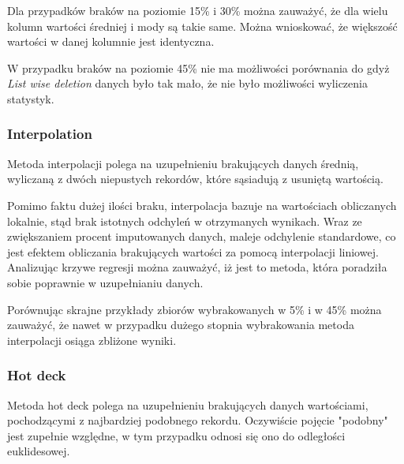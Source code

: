 \documentclass{classrep}
\begin{document}
{{            Dla przypadków braków na poziomie 15\% i 30\% można zauważyć, że dla wielu 
            kolumn wartości średniej i mody są takie same. Można wnioskować, że
            większość wartości w danej kolumnie jest identyczna.
            
            W przypadku braków na poziomie 45\% nie ma możliwości porównania do 
            gdyż \textit{List wise deletion} danych było tak mało, że nie było możliwości 
            wyliczenia statystyk.
        }

        \subsubsection{Interpolation}
        \label{summary:interpolation} {
            Metoda interpolacji polega na uzupełnieniu brakujących danych średnią,
            wyliczaną z dwóch niepustych rekordów, które sąsiadują z usuniętą wartością.

            Pomimo faktu dużej ilości braku, interpolacja bazuje na wartościach
            obliczanych lokalnie, stąd brak istotnych odchyleń w otrzymanych wynikach.
            Wraz ze zwiększaniem procent imputowanych danych, maleje odchylenie
            standardowe, co jest efektem obliczania brakujących wartości za pomocą
            interpolacji liniowej. Analizując krzywe regresji można zauważyć, iż jest
            to metoda, która poradziła sobie poprawnie w uzupełnianiu danych.

            Porównując skrajne przykłady zbiorów wybrakowanych w 5\% i w 45\% można
            zauważyć, że nawet w przypadku dużego stopnia wybrakowania metoda
            interpolacji osiąga zbliżone wyniki.
        }

        \subsubsection{Hot deck}
        \label{summary:dot-deck} {
            Metoda hot deck polega na uzupełnieniu brakujących danych wartościami,
            pochodzącymi z najbardziej podobnego rekordu. Oczywiście pojęcie "podobny"
            jest zupełnie względne, w tym przypadku odnosi się ono do odległości euklidesowej.

}}
\end{document}
